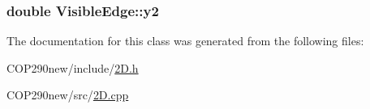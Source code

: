 \subsubsection[{\texorpdfstring{y2}{y2}}]{\setlength{\rightskip}{0pt plus 5cm}double Visible\+Edge\+::y2}\hypertarget{class_visible_edge_a4d675e604f505fa97dd268f793409b98}{}\label{class_visible_edge_a4d675e604f505fa97dd268f793409b98}


The documentation for this class was generated from the following files\+:\begin{DoxyCompactItemize}
\item 
C\+O\+P290new/include/\hyperlink{2_d_8h}{2\+D.\+h}\item 
C\+O\+P290new/src/\hyperlink{2_d_8cpp}{2\+D.\+cpp}\end{DoxyCompactItemize}
